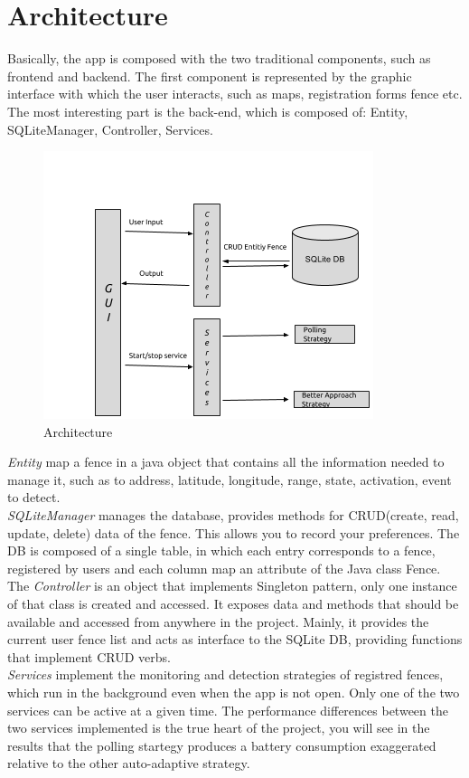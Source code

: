 \documentclass[conference]{IEEEtran}
\begin{document}
\section{Architecture}
Basically, the app is composed with the two traditional components, such as frontend and backend.
The first component is represented by the graphic interface with which the user interacts, such as maps, registration forms fence etc.
The most interesting part is the back-end, which is composed of: Entity, SQLiteManager, Controller, Services.

\begin{figure}[h]
\centering
\includegraphics[scale=0.6]{architecture}
\caption{Architecture}
\end{figure}

\textit{Entity} map a fence in a java object that contains all the information needed to manage it, such as to address, latitude, longitude, range, state, activation, event to detect.
\\\textit{SQLiteManager} manages the database, provides methods for CRUD(create, read, update, delete) data of the fence.
This allows you to record your preferences.
The DB is composed of a single table, in which each entry corresponds to a fence, registered by users and each column map an attribute of the Java class Fence.
\\The \textit{Controller} is an object that implements Singleton pattern, only one instance of that class is created and accessed.
It exposes data and methods that should be available and accessed from anywhere in the project.
Mainly, it provides the current user fence list and acts as interface to the SQLite DB, providing functions that implement CRUD verbs.
\\\textit{Services} implement the monitoring and detection strategies of registred fences, which run in the background even when the app is not open.
Only one of the two services can be active at a given time.
The performance differences between the two services implemented is the true heart of the project, you will see in the results that the polling startegy produces a battery consumption exaggerated relative to the other auto-adaptive strategy.
\end{document}
